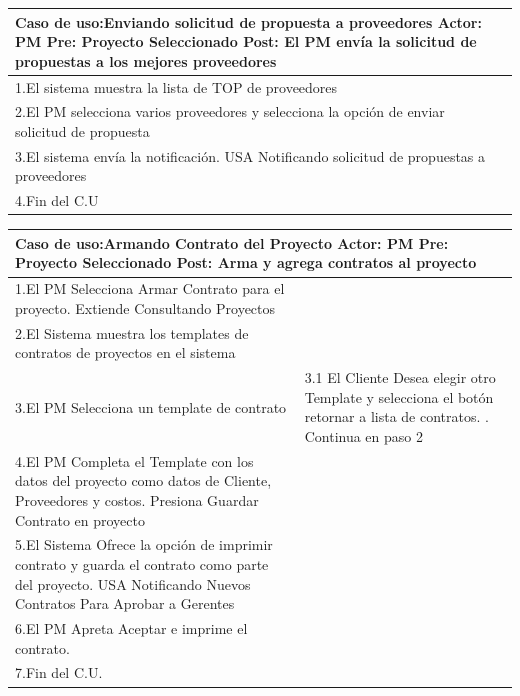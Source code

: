 \begin{longtable}{|p{}|p{}|}
    \hline
    \multicolumn{2}{|p{16cm}|}{
        \textbf{Caso de uso:}Enviando solicitud de propuesta a proveedores\newline
        \textbf{Actor:} PM\newline
        \textbf{Pre: }Proyecto Seleccionado\newline
        \textbf{Post:} El PM envía la solicitud de propuestas a los mejores proveedores
    }\\
    \hline
    1.El sistema muestra la lista de TOP de proveedores & \\
    \hline
    2.El PM selecciona varios proveedores y selecciona la opción de enviar solicitud de propuesta& \\
    \hline
    3.El sistema envía la notificación. USA Notificando solicitud de propuestas a proveedores& \\
    \hline
    4.Fin del C.U&\\
    \hline
\end{longtable}

\begin{longtable}{|p{}|p{}|}
    \hline
    \multicolumn{2}{|p{16cm}|}{
        \textbf{Caso de uso:}Armando Contrato del Proyecto \newline
        \textbf{Actor:} PM\newline
        \textbf{Pre: }Proyecto Seleccionado\newline
        \textbf{Post:} Arma y agrega contratos al proyecto
    }\\
    \hline
    1.El PM Selecciona Armar Contrato para el proyecto. Extiende Consultando Proyectos & \\
    \hline
    2.El Sistema muestra los templates de contratos de proyectos en el sistema& \\
    \hline
    3.El PM Selecciona un template de contrato& 3.1 El Cliente Desea elegir otro Template y selecciona el botón retornar a lista de contratos. \newline 3.2. Continua en paso 2 \\
    \hline
    4.El PM Completa el Template con los datos del proyecto como datos de Cliente, Proveedores y costos. Presiona Guardar Contrato en proyecto&\\
    \hline
    5.El Sistema Ofrece la opción de imprimir contrato y guarda el contrato como parte del proyecto. USA Notificando Nuevos Contratos Para Aprobar a Gerentes&\\
    \hline
    6.El PM Apreta Aceptar e imprime el contrato.&\\
    \hline
    7.Fin del C.U. &\\
    \hline
\end{longtable}


